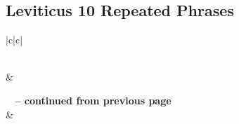 \subsection{Leviticus 10 Repeated Phrases}


\normalsize
 
\begin{center}
\begin{longtable}{|c|c|}
\caption[Leviticus 10 Repeated Phrases]{Leviticus 10 Repeated Phrases}\label{table:Repeated Phrases Leviticus 10} \\
\hline {} &  \\ \hline 
\endfirsthead
 
{{\bfseries \tablename\ \thetable{} -- continued from previous page}} \\  
\hline {} &  \\ \hline 
\endhead
 

\end{longtable}
\end{center}
